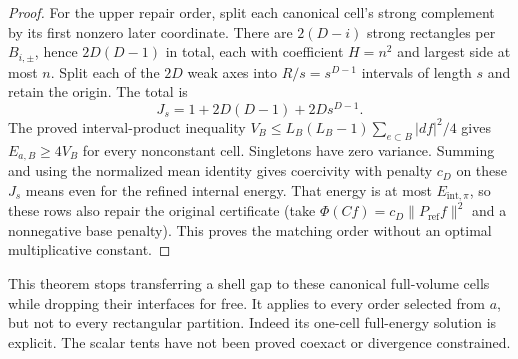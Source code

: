 \begin{proof}
For the upper repair order, split each canonical cell's strong complement
by its first nonzero later coordinate. There are $2(D-i)$ strong
rectangles per $B_{i,\pm}$, hence $2D(D-1)$ in total, each with
coefficient $H=n^2$ and largest side at most $n$. Split each of the
$2D$ weak axes into $R/s=s^{D-1}$ intervals of length $s$ and retain
the origin. The total is
\[
 J_s=1+2D(D-1)+2Ds^{D-1}.
\]
The proved interval-product inequality
$V_B\le L_B(L_B-1)\sum_{e\subset B}|df|^2/4$ gives
$E_{a,B}\ge4V_B$ for every nonconstant cell. Singletons have zero
variance. Summing and using the normalized mean identity gives
coercivity with penalty $c_D$ on these $J_s$ means even for the refined
internal energy. That energy is at most $E_{\mathrm{int},\pi}$, so
these rows also repair the original certificate (take
$\Phi(Cf)=c_D\|P_{\mathrm{ref}}f\|^2$ and a nonnegative base penalty).
This proves the matching order without an optimal multiplicative constant.
\end{proof}

This theorem stops transferring a shell gap to these canonical full-volume
cells while dropping their interfaces for free. It applies to every order
selected from $a$, but not to every rectangular partition. Indeed its
one-cell full-energy solution is explicit. The scalar tents have not been
proved coexact or divergence constrained.

